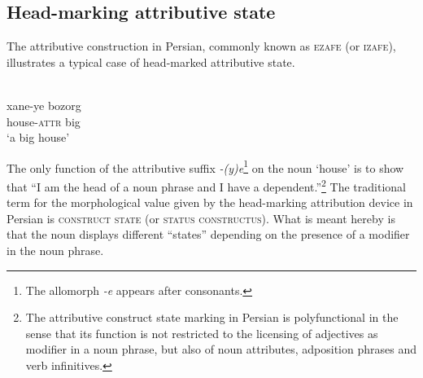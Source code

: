 \subsection{Head-marking attributive state}
\label{head-marking state}
The attributive construction in Persian, commonly known as \textsc{ezafe} (or \textsc{izafe}), illustrates a typical case of head-marked attributive state.
\begin{exe}
\ex
\label{persian constr state}
\\
\gll xane-ye bozorg\\
	house-\textsc{attr} big\\
\glt 	‘a big house’
\end{exe}
The only function of the attributive suffix \textit{-(y)e}\footnote{The allomorph \textit{-e} appears after consonants.} on the noun ‘house’ is to show that “I am the head of a noun phrase and I have a dependent.”\footnote{The attributive construct state marking in Persian is polyfunctional in the sense that its function is not restricted to the licensing of adjectives as modifier in a noun phrase, but also of noun attributes, adposition phrases and verb infinitives.} The traditional term for the morphological value given by the head-marking attribution device in Persian is \textsc{construct state} (or \textsc{status constructus}). What is meant hereby is that the noun displays different “states” depending on the presence of a modifier in the noun phrase.

